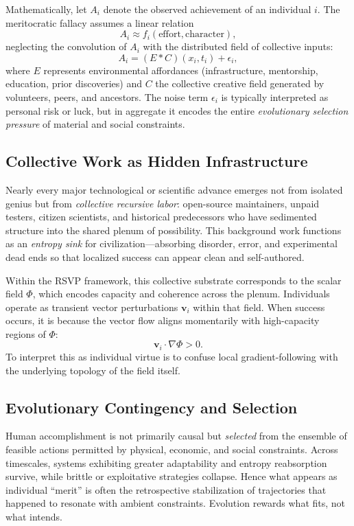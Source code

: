 \documentclass[12pt]{article}
\begin{document}
Mathematically, let $A_i$ denote the observed achievement of an individual $i$. The meritocratic fallacy assumes a linear relation
\[
A_i \approx f_i(\text{effort}, \text{character}),
\]
neglecting the convolution of $A_i$ with the distributed field of collective inputs:
\[
A_i = (E * C)(x_i,t_i) + \epsilon_i,
\]
where $E$ represents environmental affordances (infrastructure, mentorship, education, prior discoveries) and $C$ the collective creative field generated by volunteers, peers, and ancestors. The noise term $\epsilon_i$ is typically interpreted as personal risk or luck, but in aggregate it encodes the entire \emph{evolutionary selection pressure} of material and social constraints.

\subsection{Collective Work as Hidden Infrastructure}
Nearly every major technological or scientific advance emerges not from isolated genius but from \emph{collective recursive labor}: open-source maintainers, unpaid testers, citizen scientists, and historical predecessors who have sedimented structure into the shared plenum of possibility. This background work functions as an \emph{entropy sink} for civilization—absorbing disorder, error, and experimental dead ends so that localized success can appear clean and self-authored.

Within the RSVP framework, this collective substrate corresponds to the scalar field $\Phi$, which encodes capacity and coherence across the plenum. Individuals operate as transient vector perturbations $\mathbf{v}_i$ within that field. When success occurs, it is because the vector flow aligns momentarily with high-capacity regions of $\Phi$:
\[
\mathbf{v}_i \cdot \nabla \Phi > 0.
\]
To interpret this as individual virtue is to confuse local gradient-following with the underlying topology of the field itself.

\subsection{Evolutionary Contingency and Selection}
Human accomplishment is not primarily causal but \emph{selected} from the ensemble of feasible actions permitted by physical, economic, and social constraints. Across timescales, systems exhibiting greater adaptability and entropy reabsorption survive, while brittle or exploitative strategies collapse. Hence what appears as individual ``merit'' is often the retrospective stabilization of trajectories that happened to resonate with ambient constraints. Evolution rewards what fits, not what intends.
\end{document}

